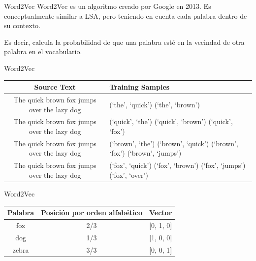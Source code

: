 \documentclass[table]{beamer}
\begin{document}
  \begin{frame}{Word2Vec}
      Word2Vec es un algoritmo creado por Google en 2013. Es conceptualmente similar a LSA, pero teniendo en cuenta cada palabra dentro de su contexto.

      Es decir, calcula la probabilidad de que una palabra esté en la vecindad de otra palabra en el vocabulario.
  \end{frame}

  \begin{frame}{Word2Vec}
      \tiny
      \begin{table}
          \centering
          \begin{tabular}{cp{45mm}}
              \toprule
              Source Text & Training Samples \\
              \midrule
              \colorbox{blue!20}{\colorbox{red!20}{The} quick brown} fox jumps over the lazy dog & (`the', `quick') \newline (`the', `brown') \\
              \midrule
              \colorbox{blue!20}{The \colorbox{red!20}{quick} brown fox} jumps over the lazy dog & (`quick', `the') \newline (`quick', `brown') \newline (`quick', `fox') \\
              \midrule
              \colorbox{blue!20}{The quick \colorbox{red!20}{brown} fox jumps} over the lazy dog & (`brown', `the') \newline (`brown', `quick') \newline (`brown', `fox') \newline (`brown', `jumps') \\
              \midrule
              The \colorbox{blue!20}{quick brown \colorbox{red!20}{fox} jumps over} the lazy dog & (`fox', `quick') \newline (`fox', `brown') \newline (`fox', `jumps') \newline (`fox', `over') \\
              \bottomrule
          \end{tabular}
      \end{table}
  \end{frame}

  \begin{frame}{Word2Vec}
      \begin{table}
          \centering
          \begin{tabular}{ccc}
              \toprule
              Palabra & Posición por orden alfabético & Vector\\
              \midrule
              fox & 2/3 & [0, 1, 0]\\
              dog & 1/3 & [1, 0, 0]\\
              zebra & 3/3 & [0, 0, 1]\\
              \bottomrule
          \end{tabular}
      \end{table}
  \end{frame}
\end{document}
